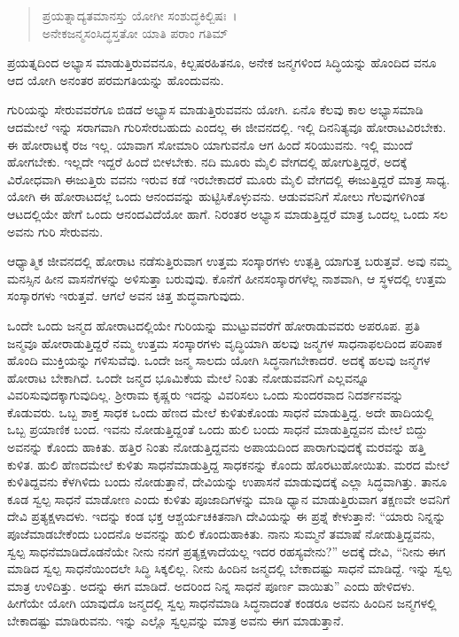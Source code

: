 \begin{verse}
ಪ್ರಯತ್ನಾದ್ಯತಮಾನಸ್ತು ಯೋಗೀ ಸಂಶುದ್ಧಕಿಲ್ಬಿಷಃ~।\\ಅನೇಕಜನ್ಮಸಂಸಿದ್ಧಸ್ತತೋ ಯಾತಿ ಪರಾಂ ಗತಿಮ್ 
\end{verse}

{\small ಪ್ರಯತ್ನದಿಂದ ಅಭ್ಯಾಸ ಮಾಡುತ್ತಿರುವವನೂ, ಕಿಲ್ಬಷರಹಿತನೂ, ಅನೇಕ ಜನ್ಮಗಳಿಂದ ಸಿದ್ಧಿಯನ್ನು ಹೊಂದಿದ ವನೂ ಆದ ಯೋಗಿ ಅನಂತರ ಪರಮಗತಿಯನ್ನು ಹೊಂದುವನು.}

ಗುರಿಯನ್ನು ಸೇರುವವರೆಗೂ ಬಿಡದೆ ಅಭ್ಯಾಸ ಮಾಡುತ್ತಿರುವವನು ಯೋಗಿ. ಏನೊ ಕೆಲವು ಕಾಲ ಅಭ್ಯಾಸಮಾಡಿ ಆದಮೇಲೆ ಇನ್ನು ಸರಾಗವಾಗಿ ಗುರಿಸೇರಬಹುದು ಎಂದಲ್ಲ ಈ ಜೀವನದಲ್ಲಿ. ಇಲ್ಲಿ ದಿನನಿತ್ಯವೂ ಹೋರಾಟವಿರಬೇಕು. ಈ ಹೋರಾಟಕ್ಕೆ ರಜ ಇಲ್ಲ. ಯಾವಾಗ ಸೋಮಾರಿ ಯಾಗುವನೊ ಆಗ ಹಿಂದೆ ಸರಿಯುವನು. ಇಲ್ಲಿ ಮುಂದೆ ಹೋಗಬೇಕು. ಇಲ್ಲದೇ ಇದ್ದರೆ ಹಿಂದೆ ಬೀಳಬೇಕು. ನದಿ ಮೂರು ಮೈಲಿ ವೇಗದಲ್ಲಿ ಹೋಗುತ್ತಿದ್ದರೆ, ಅದಕ್ಕೆ ವಿರೋಧವಾಗಿ ಈಜುತ್ತಿರು ವವನು ಇರುವ ಕಡೆ ಇರಬೇಕಾದರೆ ಮೂರು ಮೈಲಿ ವೇಗದಲ್ಲಿ ಈಜುತ್ತಿದ್ದರೆ ಮಾತ್ರ ಸಾಧ್ಯ. ಯೋಗಿ ಈ ಹೋರಾಟದಲ್ಲೆ ಒಂದು ಆನಂದವನ್ನು ಹುಟ್ಟಿಸಿಕೊಳ್ಳುವನು. ಆಡುವವನಿಗೆ ಸೋಲು ಗೆಲವುಗಳಿಗಿಂತ ಆಟದಲ್ಲಿಯೇ ಹೇಗೆ ಒಂದು ಆನಂದವಿದೆಯೋ ಹಾಗೆ. ನಿರಂತರ ಅಭ್ಯಾಸ ಮಾಡುತ್ತಿದ್ದರೆ ಮಾತ್ರ ಒಂದಲ್ಲ ಒಂದು ಸಲ ಅವನು ಗುರಿ ಸೇರುವನು.

ಆಧ್ಯಾತ್ಮಿಕ ಜೀವನದಲ್ಲಿ ಹೋರಾಟ ನಡೆಸುತ್ತಿರುವಾಗ ಉತ್ತಮ ಸಂಸ್ಕಾರಗಳು ಉತ್ಪತ್ತಿ ಯಾಗುತ್ತ ಬರುತ್ತವೆ. ಅವು ನಮ್ಮ ಮನಸ್ಸಿನ ಹೀನ ವಾಸನೆಗಳನ್ನು ಅಳಿಸುತ್ತಾ ಬರುವುವು. ಕೊನೆಗೆ ಹೀನಸಂಸ್ಕಾರಗಳೆಲ್ಲ ನಾಶವಾಗಿ, ಆ ಸ್ಥಳದಲ್ಲಿ ಉತ್ತಮ ಸಂಸ್ಕಾರಗಳು ಇರುತ್ತವೆ. ಆಗಲೆ ಅವನ ಚಿತ್ತ ಶುದ್ಧವಾಗುವುದು. 

ಒಂದೇ ಒಂದು ಜನ್ಮದ ಹೋರಾಟದಲ್ಲಿಯೇ ಗುರಿಯನ್ನು ಮುಟ್ಟುವವರೆಗೆ ಹೋರಾಡುವವರು ಅಪರೂಪ. ಪ್ರತಿ ಜನ್ಮವೂ ಹೋರಾಡುತ್ತಿದ್ದರೆ ನಮ್ಮ ಉತ್ತಮ ಸಂಸ್ಕಾರಗಳು ವೃದ್ಧಿಯಾಗಿ ಹಲವು ಜನ್ಮಗಳ ಸಾಧನಾಫಲದಿಂದ ಪರಿಪಾಕ ಹೊಂದಿ ಮುಕ್ತಿಯನ್ನು ಗಳಿಸುವೆವು. ಒಂದೇ ಜನ್ಮ ಸಾಲದು ಯೋಗಿ ಸಿದ್ಧನಾಗಬೇಕಾದರೆ. ಅದಕ್ಕೆ ಹಲವು ಜನ್ಮಗಳ ಹೋರಾಟ ಬೇಕಾಗಿದೆ. ಒಂದೇ ಜನ್ಮದ ಭೂಮಿಕೆಯ ಮೇಲೆ ನಿಂತು ನೋಡುವವನಿಗೆ ಎಲ್ಲವನ್ನೂ ವಿವರಿಸುವುದಕ್ಕಾಗುವುದಿಲ್ಲ. ಶ‍್ರೀರಾಮ ಕೃಷ್ಣರು ಇದನ್ನು ವಿವರಿಸಲು ಒಂದು ಸುಂದರವಾದ ನಿದರ್ಶನವನ್ನು ಕೊಡುವರು. ಒಬ್ಬ ಶಾಕ್ತ ಸಾಧಕ ಒಂದು ಹೆಣದ ಮೇಲೆ ಕುಳಿತುಕೊಂಡು ಸಾಧನೆ ಮಾಡುತ್ತಿದ್ದ. ಅದೇ ಹಾದಿಯಲ್ಲಿ ಒಬ್ಬ ಪ್ರಯಾಣಿಕ ಬಂದ. ಇವನು ನೋಡುತ್ತಿದ್ದಂತೆ ಒಂದು ಹುಲಿ ಬಂದು ಸಾಧನೆ ಮಾಡುತ್ತಿದ್ದವನ ಮೇಲೆ ಬಿದ್ದು ಅವನನ್ನು ಕೊಂದು ಹಾಕಿತು. ಹತ್ತಿರ ನಿಂತು ನೋಡುತ್ತಿದ್ದವನು ಅಪಾಯದಿಂದ ಪಾರಾಗುವುದಕ್ಕೆ ಮರವನ್ನು ಹತ್ತಿ ಕುಳಿತ. ಹುಲಿ ಹೆಣದಮೇಲೆ ಕುಳಿತು ಸಾಧನೆಮಾಡುತ್ತಿದ್ದ ಸಾಧಕನನ್ನು ಕೊಂದು ಹೊರಟುಹೋಯಿತು. ಮರದ ಮೇಲೆ ಕುಳಿತಿದ್ದವನು ಕೆಳಗಿಳಿದು ಬಂದು ನೋಡುತ್ತಾನೆ, ದೇವಿಯನ್ನು ಉಪಾಸನೆ ಮಾಡುವುದಕ್ಕೆ ಎಲ್ಲಾ ಸಿದ್ಧವಾಗಿತ್ತು. ತಾನೂ ಕೂಡ ಸ್ವಲ್ಪ ಸಾಧನೆ ಮಾಡೋಣ ಎಂದು ಕುಳಿತು ಪೂಜಾದಿಗಳನ್ನು ಮಾಡಿ ಧ್ಯಾನ ಮಾಡುತ್ತಿರುವಾಗ ತಕ್ಷಣವೇ ಅವನಿಗೆ ದೇವಿ ಪ್ರತ್ಯಕ್ಷಳಾದಳು. ಇದನ್ನು ಕಂಡ ಭಕ್ತ ಆಶ್ಚರ್ಯಚಕಿತನಾಗಿ ದೇವಿಯನ್ನು ಈ ಪ್ರಶ್ನೆ ಕೇಳುತ್ತಾನೆ: “ಯಾರು ನಿನ್ನನ್ನು ಪೂಜೆಮಾಡಬೇಕೆಂದು ಬಂದನೊ ಅವನನ್ನು ಹುಲಿ ಕೊಂದುಹಾಕಿತು. ನಾನು ಸುಮ್ಮನೆ ತಮಾಷೆ ನೋಡುತ್ತಿದ್ದವನು, ಸ್ವಲ್ಪ ಸಾಧನೆಮಾಡಿದೊಡನೆಯೇ ನೀನು ನನಗೆ ಪ್ರತ್ಯಕ್ಷಳಾದೆಯಲ್ಲ ಇದರ ರಹಸ್ಯವೇನು?” ಅದಕ್ಕೆ ದೇವಿ, “ನೀನು ಈಗ ಮಾಡಿದ ಸ್ವಲ್ಪ ಸಾಧನೆಯಿಂದಲೇ ಸಿದ್ಧಿ ಸಿಕ್ಕಲಿಲ್ಲ. ನೀನು ಹಿಂದಿನ ಜನ್ಮದಲ್ಲಿ ಬೇಕಾದಷ್ಟು ಸಾಧನೆ ಮಾಡಿದ್ದೆ. ಇನ್ನು ಸ್ವಲ್ಪ ಮಾತ್ರ ಉಳಿದಿತ್ತು. ಅದನ್ನು ಈಗ ಮಾಡಿದೆ. ಅದರಿಂದ ನಿನ್ನ ಸಾಧನೆ ಪೂರ್ಣ ವಾಯಿತು” ಎಂದು ಹೇಳಿದಳು. ಹೀಗೆಯೇ ಯೋಗಿ ಯಾವುದೊ ಜನ್ಮದಲ್ಲಿ ಸ್ವಲ್ಪ ಸಾಧನೆಮಾಡಿ ಸಿದ್ಧನಾದಂತೆ ಕಂಡರೂ ಅವನು ಹಿಂದಿನ ಜನ್ಮಗಳಲ್ಲಿ ಬೇಕಾದಷ್ಟು ಮಾಡಿರುವನು. ಇನ್ನು ಎಲ್ಲೊ ಸ್ವಲ್ಪವನ್ನು ಮಾತ್ರ ಅವನು ಈಗ ಮಾಡುತ್ತಾನೆ.

